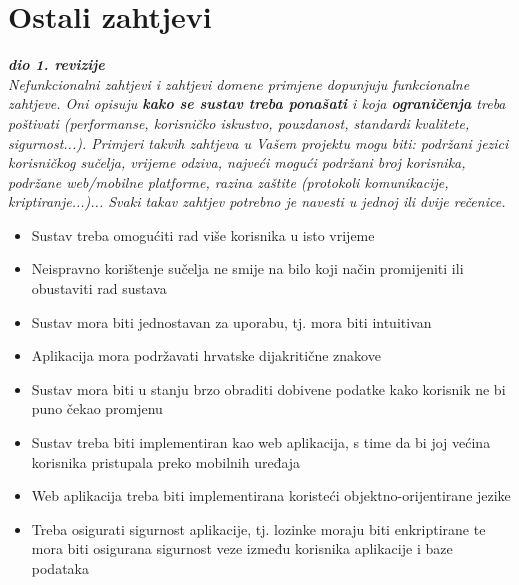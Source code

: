 		\section{Ostali zahtjevi}
		
			\textbf{\textit{dio 1. revizije}}\\
		 
			 \textit{Nefunkcionalni zahtjevi i zahtjevi domene primjene dopunjuju funkcionalne zahtjeve. Oni opisuju \textbf{kako se sustav treba ponašati} i koja \textbf{ograničenja} treba poštivati (performanse, korisničko iskustvo, pouzdanost, standardi kvalitete, sigurnost...). Primjeri takvih zahtjeva u Vašem projektu mogu biti: podržani jezici korisničkog sučelja, vrijeme odziva, najveći mogući podržani broj korisnika, podržane web/mobilne platforme, razina zaštite (protokoli komunikacije, kriptiranje...)... Svaki takav zahtjev potrebno je navesti u jednoj ili dvije rečenice.}
			 \begin{itemize}
			 	\item  Sustav treba omogućiti rad više korisnika u isto vrijeme
			 	\item  Neispravno korištenje sučelja ne smije na bilo koji način promijeniti ili obustaviti rad sustava
			 	\item  Sustav mora biti jednostavan za uporabu, tj. mora biti intuitivan
			 	\item Aplikacija mora podržavati hrvatske dijakritične znakove
			 	\item  Sustav mora biti u stanju brzo obraditi dobivene podatke kako korisnik ne bi puno čekao promjenu
			 	\item  Sustav treba biti implementiran kao web aplikacija, s time da bi joj većina korisnika pristupala preko mobilnih uređaja
			 	\item Web aplikacija treba biti implementirana koristeći objektno-orijentirane jezike
			 	\item  Treba osigurati sigurnost aplikacije, tj. lozinke moraju biti enkriptirane te mora biti osigurana sigurnost veze između korisnika aplikacije i baze podataka 
			 \end{itemize}
			 
			 
	